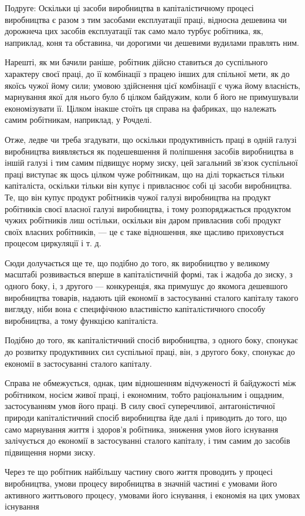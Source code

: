 Подруге: Оскільки ці засоби виробництва в капіталістичному
процесі виробництва є разом з тим засобами експлуатації праці,
відносна дешевина чи дорожнеча цих засобів експлуатації так
само мало турбує робітника, як, наприклад, коня та обставина,
чи дорогими чи дешевими вудилами правлять ним.

Нарешті, як ми бачили раніше, робітник дійсно ставиться
до суспільного характеру своєї праці, до її комбінації з працею
інших для спільної мети, як до якоїсь чужої йому сили; умовою
здійснення цієї комбінації є чужа йому власність, марнування
якої для нього було б цілком байдужим, коли б його не примушували
економізувати її. Цілком інакше стоїть ця справа
на фабриках, що належать самим робітникам, наприклад, у Рочделі.

Отже, ледве чи треба згадувати, що оскільки продуктивність
праці в одній галузі виробництва виявляється як подешевшення
й поліпшення засобів виробництва в іншій галузі і тим самим
підвищує норму зиску, цей загальний зв’язок суспільної праці
виступає як щось цілком чуже робітникам, що на ділі торкається
тільки капіталіста, оскільки тільки він купує і привласнює
собі ці засоби виробництва. Те, що він купує продукт робітників чужої галузі виробництва на продукт
робітників своєї власної галузі виробництва, і тому розпоряджається продуктом чужих робітників лиш
остільки, оскільки він даром привласнив собі продукт своїх власних робітників, — це є таке
відношення,
яке щасливо приховується процесом циркуляції і т. д.

Сюди долучається ще те, що подібно до того, як виробництво у великому масштабі розвивається вперше в
капіталістичній формі, так і жадоба до зиску, з одного боку, і, з другого — конкуренція, яка
примушує до якомога дешевшого виробництва товарів, надають цій економії в застосуванні сталого
капіталу такого вигляду, ніби вона є специфічною властивістю
капіталістичного способу виробництва, а тому функцією капіталіста.

Подібно до того, як капіталістичний спосіб виробництва,
з одного боку, спонукає до розвитку продуктивних сил суспільної праці, він, з другого боку, спонукає
до економії в застосуванні сталого капіталу.

Справа не обмежується, однак, цим відношенням відчуженості
й байдужості між робітником, носієм живої праці, і економним,
тобто раціональним і ощадним, застосуванням умов його праці.
В силу своєї суперечливої, антагоністичної природи капіталістичний спосіб виробництва йде далі і
приводить до того, що само
марнування життя і здоров’я робітника, зниження умов його
існування залічується до економії в застосуванні сталого капіталу, і тим самим до засобів підвищення
норми зиску.

Через те що робітник найбільшу частину свого життя проводить у процесі виробництва, умови процесу
виробництва
в значній частині є умовами його активного життьового процесу, умовами його існування, і економія на
цих умовах існування
\parbreak{}  %
